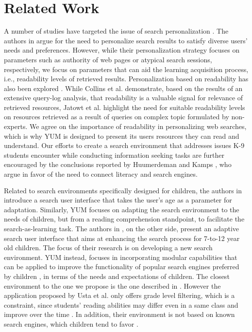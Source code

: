 \documentclass{sig-alternate-05-2015}
\begin{document}
\section{Related Work}
A number of studies have targeted the issue of search personalization \cite{Col11, Eic13, Jat12, Wan13}. The authors in \cite{Eic13, Wan13} argue for the need to personalize search results to satisfy diverse users' needs and preferences. However, while their personalization strategy focuses on parameters such as authority of web pages or atypical search sessions, respectively, we focus on parameters that can aid the learning acquisition process, i.e., readability levels of retrieved results. Personalization based on readability has also been explored \cite{Col11, Jat12}. While Collins et al. \cite{Col11} demonstrate, based on the results of an extensive query-log analysis, that readability is a valuable signal for relevance of retrieved resources, Jatowt et al. \cite{Jat12} highlight the need for suitable readability levels on resources retrieved as a result of queries on complex topic formulated by non-experts. We agree on the importance of readability in personalizing web searches, which is why YUM is designed to present its users resources they can read and understand.
 Our efforts to create a search environment that addresses issues K-9 students encounter while conducting information seeking tasks are further encouraged by the conclusions reported by Huumerdeman and Kamps \cite{Huu15}, who argue in favor of the need to connect literacy and search engines.

Related to search environments specifically designed for children, the authors in \cite{Gos15} introduce a search user interface that takes the user's age as a parameter for adaptation. Similarly, YUM focuses on adapting the search environment to the needs of children, but from a reading comprehension standpoint, to facilitate the search-as-learning task. The authors in \cite{Gos13}, on the other side, present an adaptive search user interface that aims at enhancing the search process for 7-to-12 year old children. The focus of their research is on developing a new search environment. YUM instead, focuses in incorporating modular capabilities that can be applied to improve the functionality of popular search engines preferred by children \cite{Bil13},  in terms of the needs and expectations of children.   The closest environment to the one we propose is the one described in \cite{Ust14}. However the application proposed by Usta et al. only offers grade level filtering, which is a constraint, since students' reading abilities may differ even in a same class and improve over the time \cite{sh13}. In addition, their environment is not based on known search engines, which children tend to favor \cite{Bil13}. 
\end{document}
